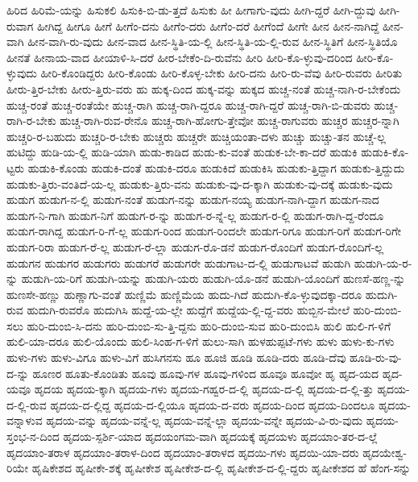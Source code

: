 {ಹಿರಿದ
ಹಿರಿಮೆ-ಯನ್ನು
ಹಿಸುಕಲಿ
ಹಿಸುಕಿ-ಬಿ-ಡು-ತ್ತದೆ
ಹಿಸುಕು
ಹೀ
ಹೀಗಾಗು-ವುದು
ಹೀಗಿ-ದ್ದರೆ
ಹೀಗಿ-ದ್ದುವು
ಹೀಗಿ-ರುವಾಗ
ಹೀಗಿದ್ದ
ಹೀಗೂ
ಹೀಗೆ
ಹೀಗೆಂ-ದನು
ಹೀಗೆಂ-ದರು
ಹೀಗೆಂ-ದರೆ
ಹೀಗೆಂದೆ
ಹೀಗೇ
ಹೀನ
ಹೀನ-ನಾಗಿದ್ದೆ
ಹೀನ-ವಾಗಿ
ಹೀನ-ವಾಗಿ-ರು-ವುದು
ಹೀನ-ವಾದ
ಹೀನ-ಸ್ಥಿತಿ-ಯ-ಲ್ಲಿ
ಹೀನ-ಸ್ಥಿತಿ-ಯ-ಲ್ಲಿ-ರುವ
ಹೀನ-ಸ್ಥಿತಿಗೆ
ಹೀನ-ಸ್ಥಿತಿಯೊ
ಹೀನತೆ
ಹೀನಾಯ-ವಾದ
ಹೀಯಾಳಿ-ಸಿ-ದರೆ
ಹೀರ-ಬೇಕೆಂ-ದಿ-ರುವೆನು
ಹೀರಿ
ಹೀರಿ-ಕೊ-ಳ್ಳುವು-ದರಿಂದ
ಹೀರಿ-ಕೊ-ಳ್ಳುವುದು
ಹೀರಿ-ಕೊಂಡಿದ್ದರು
ಹೀರಿ-ಕೊಂಡು
ಹೀರಿ-ಕೊಳ್ಳ-ಬೇಕು
ಹೀರಿ-ದನು
ಹೀರಿ-ರು-ವೆವು
ಹೀರಿ-ರುವರು
ಹೀರಿತು
ಹೀರು-ತ್ತಿರ-ಬೇಕು
ಹೀರು-ತ್ತಿರು-ವರು
ಹು
ಹುಕ್ಕ-ದಿಂದ
ಹುಕ್ಕ-ವನ್ನು
ಹುಕ್ಕದ
ಹುಚ್ಚ-ನಂತೆ
ಹುಚ್ಚ-ನಾಗಿ-ರ-ಬೇಕೆಂದು
ಹುಚ್ಚ-ರಂತೆ
ಹುಚ್ಚ-ರಂತೆಯೇ
ಹುಚ್ಚ-ರಾಗಿ
ಹುಚ್ಚ-ರಾಗಿ-ದ್ದರೂ
ಹುಚ್ಚ-ರಾಗಿ-ದ್ದರೆ
ಹುಚ್ಚ-ರಾಗಿ-ಬಿ-ಡುವರು
ಹುಚ್ಚ-ರಾಗಿ-ರ-ಬೇಕು
ಹುಚ್ಚ-ರಾಗಿ-ರುವ-ರೇನೊ
ಹುಚ್ಚ-ರಾಗಿ-ಹೋಗು-ತ್ತೇವೋ
ಹುಚ್ಚ-ರಾಗುವರು
ಹುಚ್ಚರ
ಹುಚ್ಚರ-ನ್ನಾಗಿ
ಹುಚ್ಚರಿ-ರ-ಬಹುದು
ಹುಚ್ಚರಿ-ರ-ಬೇಕು
ಹುಚ್ಚರು
ಹುಚ್ಚರೇ
ಹುಚ್ಚಿಯಂತಾ-ದಳು
ಹುಚ್ಚು
ಹುಚ್ಚು-ತನ
ಹುಚ್ಚೆ-ಲ್ಲ
ಹುಟಿದ್ದು
ಹುಡಿ-ಯ-ಲ್ಲಿ
ಹುಡಿ-ಯಾಗಿ
ಹುಡು-ಕಾಡಿದ
ಹುಡು-ಕು-ವಂತೆ
ಹುಡುಕ-ಬೇ-ಕಾ-ದರೆ
ಹುಡುಕಿ
ಹುಡುಕಿ-ಕೊ-ಟ್ಟರು
ಹುಡುಕಿ-ಕೊಂಡು
ಹುಡುಕಿ-ದಂತೆ
ಹುಡುಕಿ-ದರೂ
ಹುಡುಕಿದೆ
ಹುಡುಕಿಸಿ
ಹುಡುಕು-ತ್ತಿದ್ದಾಗ
ಹುಡುಕು-ತ್ತಿದ್ದುದು
ಹುಡುಕು-ತ್ತಿರು-ವಂತಿದೆ-ಯ-ಲ್ಲ
ಹುಡುಕು-ತ್ತಿರು-ವನು
ಹುಡುಕು-ವು-ದ-ಕ್ಕಾಗಿ
ಹುಡುಕು-ವು-ದಕ್ಕೆ
ಹುಡುಕು-ವುದು
ಹುಡುಗ
ಹುಡುಗ-ನ-ಲ್ಲಿ
ಹುಡುಗ-ನಂತೆ
ಹುಡುಗ-ನನ್ನು
ಹುಡುಗ-ನಯ್ಯ
ಹುಡುಗ-ನಾಗಿ-ದ್ದಾಗ
ಹುಡುಗ-ನಾದ
ಹುಡುಗ-ನಿ-ಗಾಗಿ
ಹುಡುಗ-ನಿಗೆ
ಹುಡುಗ-ರ-ನ್ನು
ಹುಡುಗ-ರ-ನ್ನೆ-ಲ್ಲ
ಹುಡುಗ-ರ-ಲ್ಲಿ
ಹುಡುಗ-ರಾಗಿ-ದ್ದ-ರೆಂದೂ
ಹುಡುಗ-ರಾಗಿದ್ದ
ಹುಡುಗ-ರಿ-ಗೆ-ಲ್ಲ
ಹುಡುಗ-ರಿಂದ
ಹುಡುಗ-ರಿಂದಲೇ
ಹುಡುಗ-ರಿಗೂ
ಹುಡುಗ-ರಿಗೆ
ಹುಡುಗ-ರಿಗೇ
ಹುಡುಗ-ರಿರಾ
ಹುಡುಗ-ರೆ-ಲ್ಲ
ಹುಡುಗ-ರೆ-ಲ್ಲಾ
ಹುಡುಗ-ರೊ-ಡನೆ
ಹುಡುಗ-ರೊಂದಿಗೆ
ಹುಡುಗ-ರೊಂದಿಗೆ-ಲ್ಲ
ಹುಡುಗನ
ಹುಡುಗರ
ಹುಡುಗರು
ಹುಡುಗರೆ
ಹುಡುಗರೇ
ಹುಡುಗಾಟ-ದ-ಲ್ಲಿ
ಹುಡುಗಾಟವೆ
ಹುಡುಗಿ
ಹುಡುಗಿ-ಯ-ರ-ನ್ನು
ಹುಡುಗಿ-ಯ-ರಿಗೆ
ಹುಡುಗಿ-ಯನ್ನು
ಹುಡುಗಿ-ಯರು
ಹುಡುಗಿ-ಯೊ-ಡನೆ
ಹುಡುಗಿ-ಯೊಂದಿಗೆ
ಹುಣಸೆ-ಹಣ್ಣ-ನ್ನು
ಹುಣಸೇ-ಹಣ್ಣು
ಹುಣ್ಣಾಗು-ವಂತೆ
ಹುಣ್ಣಿಮೆ
ಹುಣ್ಣಿಮೆಯ
ಹುದು-ಗಿದೆ
ಹುದುಗಿ-ಕೊ-ಳ್ಳುವುದಕ್ಕಾ-ದರೂ
ಹುದುಗಿ-ರುವ
ಹುದುಗಿ-ರುವರೊ
ಹುದುಗಿಸಿ
ಹುದ್ದೆ-ಯ-ಲ್ಲೇ
ಹುದ್ದೆಗೆ
ಹುದ್ದೆಯ-ಲ್ಲಿ-ದ್ದ-ವರು
ಹುಬ್ಬಿನ-ಮೇಲೆ
ಹುರಿ-ದುಂಬಿ-ಸಲು
ಹುರಿ-ದುಂಬಿ-ಸಿ-ದನು
ಹುರಿ-ದುಂಬಿ-ಸು-ತ್ತಿ-ದ್ದನು
ಹುರಿ-ದುಂಬಿ-ಸುವ
ಹುರಿ-ದುಂಬಿಸಿ
ಹುಲಿ
ಹುಲಿ-ಗ-ಳಿಗೆ
ಹುಲಿ-ಯಾ-ದರೂ
ಹುಲಿ-ಯೊಂದು
ಹುಲಿ-ಸಿಂಹ-ಗ-ಳಿಗೆ
ಹುಲು-ಸಾಗಿ
ಹುಳಹುಪ್ಪಟೆ-ಗಳು
ಹುಳು
ಹುಳು-ಕು-ಗಳು
ಹುಳು-ಗಳು
ಹುಳು-ವಿಗೂ
ಹುಳು-ವಿಗೆ
ಹುಸಿಗನಸು
ಹೂ
ಹೂಜಿ
ಹೂಡಿ
ಹೂಡಿ-ದರು
ಹೂಡಿ-ದೆವು
ಹೂಡಿ-ರು-ವು-ದ-ನ್ನು
ಹೂಣರ
ಹೂತು-ಕೊಂಡಿತು
ಹೂವು
ಹೂವು-ಗಳ
ಹೂವು-ಗಳಿಂದ
ಹೂವೂ
ಹೂವೋ
ಹೃ
ಹೃದ-ಯದ
ಹೃದ-ಯವೂ
ಹೃದಯ
ಹೃದಯ-ಕ್ಕಾಗಿ
ಹೃದಯ-ಗಳು
ಹೃದಯ-ಗಹ್ವರ-ದ-ಲ್ಲಿ
ಹೃದಯ-ದ-ಲ್ಲಿ
ಹೃದಯ-ದ-ಲ್ಲಿ-ತ್ತು
ಹೃದಯ-ದ-ಲ್ಲಿ-ರುವ
ಹೃದಯ-ದ-ಲ್ಲಿದ್ದ
ಹೃದಯ-ದ-ಲ್ಲಿಯೂ
ಹೃದಯ-ದ-ವರು
ಹೃದಯ-ದಿಂದ
ಹೃದಯ-ದಿಂದಲೂ
ಹೃದಯ-ವನ್ನಾಳುವ
ಹೃದಯ-ವನ್ನು
ಹೃದಯ-ವನ್ನೆ-ಲ್ಲ
ಹೃದಯ-ವನ್ನೆ-ಲ್ಲಾ
ಹೃದಯ-ವನ್ನೇ
ಹೃದಯ-ವಿ-ರು-ವುದು
ಹೃದಯ-ಸ್ತಂಭ-ನ-ದಿಂದ
ಹೃದಯ-ಸ್ಪರ್ಶಿ-ಯಾದ
ಹೃದಯಂಗಮ-ವಾಗಿ
ಹೃದಯಕ್ಕೆ
ಹೃದಯಳು
ಹೃದಯಾಂ-ತರ-ದ-ಲ್ಲೆ
ಹೃದಯಾಂ-ತರಾಳ
ಹೃದಯಾಂ-ತರಾಳ-ದಿಂದ
ಹೃದಯಾಂ-ತರಾಳದ
ಹೃದಯಿ-ಗಳು
ಹೃದಯಿ-ಯಾ-ದರು
ಹೃದಯೇಶ್ವ-ರಿಯೇ
ಹೃಷಿಕೇಶದ
ಹೃಷೀಕೇ-ಶಕ್ಕೆ
ಹೃಷೀಕೇಶ
ಹೃಷೀಕೇಶ-ದ-ಲ್ಲಿ
ಹೃಷೀಕೇಶ-ದ-ಲ್ಲಿ-ದ್ದರು
ಹೃಷೀಕೇಶದ
ಹೆ
ಹೆಂಗ-ಸನ್ನು
}
